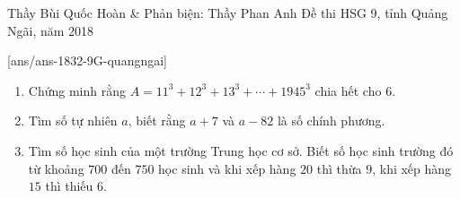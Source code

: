 \begin{name}
{Thầy  Bùi Quốc Hoàn \& Phản biện: Thầy  Phan Anh}
{Đề thi HSG 9, tỉnh Quảng Ngãi, năm 2018}
\end{name}
\setcounter{ex}{0}
[ans/ans-1832-9G-quangngai]
\begin{ex}%
	\begin{enumerate}
		\item Chứng minh rằng $A = 11^{3} + 12^{3} + 13^{3} + \cdots + 1945^{3} $ chia hết cho $6$.
		\item Tìm số tự nhiên $a$, biết rằng $a + 7$ và $a - 82$ là số chính phương.
		\item Tìm số học sinh của một trường Trung học cơ sở. Biết số học sinh trường đó từ khoảng $700$ đến $750$ học sinh và khi xếp hàng $20$ thì thừa $9$, khi xếp hàng $15$ thì thiếu $6$.
	\end{enumerate}
\end{ex}
